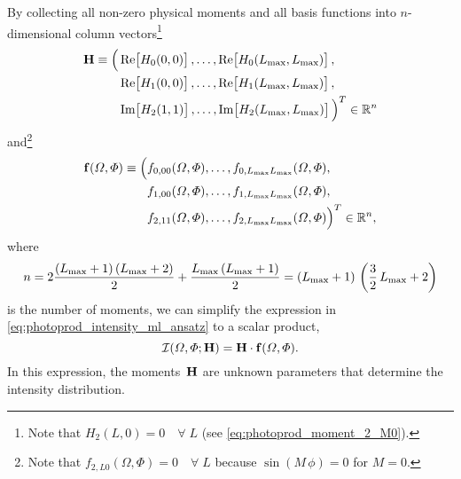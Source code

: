 By collecting all non-zero physical moments and all basis functions
into $n$-dimensional column vectors\footnote{Note that $H_2(L, 0) = 0
\quad\forall\; L$ (see \cref{eq:photoprod_moment_2_M0}).}
\begin{align}
  \vect{H}
  \equiv \Big(%
    &\Re[1]{H_0(0, 0)},
    \ldots,
    \Re[1]{H_0(L_\text{max}, L_\text{max})},
    \nonumber \\
    &\Re[1]{H_1(0, 0)},
    \ldots,
    \Re[1]{H_1(L_\text{max}, L_\text{max})},
    \nonumber \\
    &\Im[1]{H_2(1, 1)},
    \ldots,
    \Im[1]{H_2(L_\text{max}, L_\text{max})}
  \Big)^T
  \in \mathbb{R}^n
\end{align}
and\footnote{Note that $f_{2, L 0}(\Omega, \Phi) = 0 \quad\forall\; L$
because $\sin(M\, \phi) = 0$ for $M = 0$.}
\begin{align}
  \vect{f}(\Omega, \Phi)
  \equiv \Big(%
    &f_{0, 0 0}(\Omega, \Phi),
    \ldots,
    f_{0, L_\text{max} L_\text{max}}(\Omega, \Phi),
    \nonumber \\
    &f_{1, 0 0}(\Omega, \Phi),
    \ldots,
    f_{1, L_\text{max} L_\text{max}}(\Omega, \Phi),
    \nonumber \\
    &f_{2, 1 1}(\Omega, \Phi),
    \ldots,
    f_{2, L_\text{max} L_\text{max}}(\Omega, \Phi)
  \Big)^T
  \in \mathbb{R}^n,
\end{align}
where
\begin{equation}
  n
  = 2 \frac{(L_\text{max} + 1)\, (L_\text{max} + 2)}{2} + \frac{L_\text{max}\, (L_\text{max} + 1)}{2}
  = (L_\text{max} + 1)\, \rBrk{\frac{3}{2}\, L_\text{max} + 2}
\end{equation}
is the number of moments, we can simplify the expression in
\cref{eq:photoprod_intensity_ml_ansatz} to a scalar product, \ie
\begin{equation}
  \label{eq:photoprod_intensity_ml}
  \mathcal{I}(\Omega, \Phi; \bm{\mathrm{H}})
  = \bm{\mathrm{H}} \cdot \bm{\mathrm{f}}(\Omega, \Phi).
\end{equation}
In this expression, the moments~$\bm{\mathrm{H}}$ are unknown parameters that
determine the intensity distribution.

